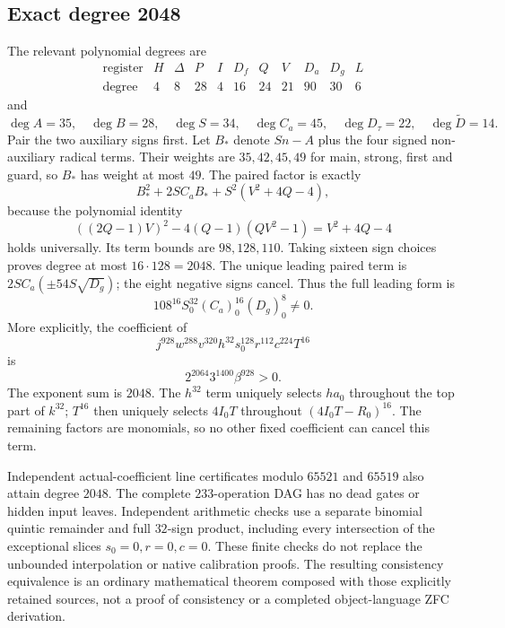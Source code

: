 \documentclass[11pt]{article}
\begin{document}
\subsection{Exact degree 2048}
The relevant polynomial degrees are
\[
\begin{array}{c|rrrrrrrrrr}
\text{register}&H&\Delta&P&I&D_f&Q&V&D_a&D_g&L\\\hline
\text{degree}&4&8&28&4&16&24&21&90&30&6
\end{array}
\]
and
\[
 \deg A=35,\quad\deg B=28,\quad\deg S=34,
 \quad\deg C_a=45,\quad\deg D_\tau=22,
 \quad\deg\widetilde D=14.
\]
Pair the two auxiliary signs first. Let $B_*$ denote $Sn-A$ plus
the four signed non-auxiliary radical terms. Their weights are
$35,42,45,49$ for main, strong, first and guard, so $B_*$ has weight
at most $49$. The paired factor is exactly
\[
 B_*^2+2SC_aB_*+S^2(V^2+4Q-4),
\]
because the polynomial identity
\[
 ((2Q-1)V)^2-4(Q-1)(QV^2-1)=V^2+4Q-4
\]
holds universally. Its term bounds are $98,128,110$. Taking sixteen
sign choices proves degree at most $16\cdot128=2048$.
The unique leading paired term is
$2SC_a(\mathbin{\pm}54S\sqrt{D_g})$; the eight negative signs cancel.
Thus the full leading form is
\[
 108^{16}S_0^{32}(C_a)_0^{16}(D_g)_0^8\ne0.
\]
More explicitly, the coefficient of
\[
 j^{928}w^{288}v^{320}h^{32}s_0^{128}r^{112}c^{224}T^{16}
\]
is
\[
 \boxed{2^{2064}3^{1400}\beta^{928}>0.}
\]
The exponent sum is $2048$. The $h^{32}$ term uniquely selects
$ha_0$ throughout the top part of $k^{32}$; $T^{16}$ then uniquely
selects $4I_0T$ throughout $(4I_0T-R_0)^{16}$. The remaining factors
are monomials, so no other fixed coefficient can cancel this term.

Independent actual-coefficient line certificates modulo $65521$ and
$65519$ also attain degree $2048$. The complete $233$-operation DAG
has no dead gates or hidden input leaves. Independent arithmetic checks
use a separate binomial quintic remainder and full $32$-sign product,
including every intersection of the exceptional slices $s_0=0,r=0,c=0$.
These finite checks do not replace the unbounded interpolation or
native calibration proofs. The resulting consistency equivalence is an
ordinary mathematical theorem composed with those explicitly retained
sources, not a proof of consistency or a completed object-language
ZFC derivation.
\end{document}
